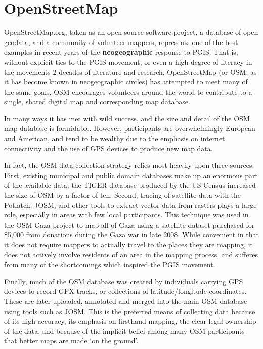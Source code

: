 \documentclass[11pt]{report}
\begin{document}
\section{OpenStreetMap}
\label{sec:openstreetmap}
OpenStreetMap.org, taken as an open-source software project, a database of open geodata, and a community of volunteer mappers, represents one of the best examples in recent years of the \textbf{neogeographic} response to PGIS. That is, without explicit ties to the PGIS movement, or even a high degree of literacy in the movements 2 decades of literature and research, OpenStreetMap (or OSM, as it has become known in neogeographic circles) has attempted to meet many of the same goals. OSM encourages volunteers around the world to contribute to a single, shared digital map and corresponding map database. 

In many ways it has met with wild success, and the size and detail of the OSM map database is formidable. 
However, participants are overwhelmingly European and American, and tend to be wealthy due to the emphasis on internet connectivity and the use of GPS devices to produce new map data.

In fact, the OSM data collection strategy relies most heavily upon three sources. First, existing municipal and public domain databases make up an enormous part of the available data; the TIGER database produced by the US Census increased the size of OSM by a factor of ten. Second, tracing of satellite data with the Potlatch, JOSM, and other tools to extract vector data from rasters plays a large role, especially in areas with few local participants. This technique was used in the OSM Gaza project to map all of Gaza using a satellite dataset purchased for \$5,000 from donations during the Gaza war in late 2008. \cite{maron2010openstreetmap} While convenient in that it does not require mappers to actually travel to the places they are mapping, it does not actively involve residents of an area in the mapping process, and sufferes from many of the shortcomings which inspired the PGIS movement. 

Finally, much of the OSM database was created by individuals carrying GPS devices to record GPX tracks, or collections of latitude/longitude coordinates. These are later uploaded, annotated and merged into the main OSM database using tools such as JOSM. This is the preferred means of collecting data because of its high accuracy, its emphasis on firsthand mapping, the clear legal ownership of the data, and because of the implicit belief among many OSM participants that better maps are made `on the ground'. 
\end{document}
